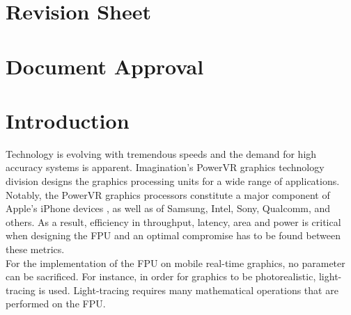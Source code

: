 \documentclass[11pt]{report}
\begin{document}
\pagebreak
\section{Revision Sheet}




\section{Document Approval}



\pagebreak

\section{Introduction}
Technology is evolving with tremendous speeds and the demand for high accuracy systems is apparent. Imagination’s PowerVR graphics technology division designs the graphics processing units for a wide range of applications. Notably, the PowerVR graphics processors constitute a major component of Apple's iPhone devices \cite{Apple14}, as well as of Samsung, Intel, Sony, Qualcomm, and others. As a result, efficiency in throughput, latency, area and power is critical when designing the FPU and an optimal compromise has to be found between these metrics. \\

\noindent
For the implementation of the FPU on mobile real-time graphics, no parameter can be sacrificed. For instance, in order for graphics to be photorealistic, light-tracing is used. Light-tracing requires many mathematical operations that are performed on the FPU.\\
\end{document}
